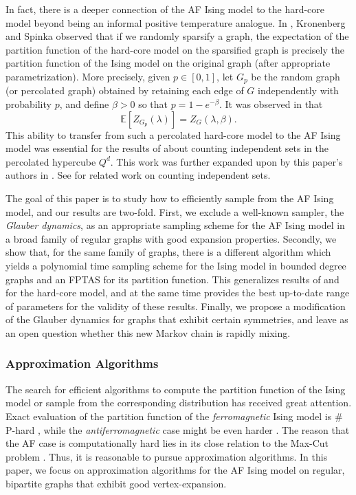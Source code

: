 \documentclass[reqno,a4paper,11pt]{amsart}
\newcommand{\lam}{\lambda}
\newcommand{\E}{\mathbb{E}}
\begin{document}
In fact, there is a deeper connection of the AF Ising model to the hard-core model beyond being an informal positive temperature analogue. In \cite{kronenberg2022independent}, Kronenberg and Spinka observed that if we randomly sparsify a graph, the expectation of the partition function of the hard-core model on the sparsified graph is precisely the partition function of the Ising model on the original graph (after appropriate parametrization). More precisely, given $p \in [0,1]$, let $G_p$ be the random graph (or percolated graph) obtained by retaining each edge of $G$ independently with probability $p$, and define $\beta > 0$ so that $p=1-e^{-\beta}$. It was observed in \cite{kronenberg2022independent} that
\begin{equation*}
    \E[Z_{G_p}(\lam)]=Z_G(\lam,\beta).
\end{equation*}
This ability to transfer from such a percolated hard-core model to the AF Ising model was essential for the results of \cite{kronenberg2022independent} about counting independent sets in the percolated hypercube $Q^d$. This work was further expanded upon by this paper's authors in \cite{GeKaSaWdo25}. See \cite{balogh2021independent,chowdhury2024gaussian, CEGK25,jenssen2020independent} for related work on counting independent sets.

The goal of this paper is to study how to efficiently sample from the AF Ising model, and our results are two-fold. First, we exclude a well-known sampler, the \textit{Glauber dynamics}, as an appropriate sampling scheme for the AF Ising model in a broad family of regular graphs with good expansion properties. Secondly, we show that, for the same family of graphs, there is a different algorithm which yields a polynomial time sampling scheme for the Ising model in bounded degree graphs and an FPTAS for its partition function. This generalizes results of \cite{GaTe2006} and \cite{JePePo23} for the hard-core model, and at the same time provides the best up-to-date range of parameters for the validity of these results. Finally, we propose a modification of the Glauber dynamics for graphs that exhibit certain symmetries, and leave as an open question whether this new Markov chain is rapidly mixing.


\subsubsection{Approximation Algorithms}
The search for efficient algorithms to compute the partition function of the Ising model or sample from the corresponding distribution has received great attention. Exact evaluation of the partition function of the \emph{ferromagnetic} Ising model is $\#$P-hard \cite{JeSi93}, while the \emph{antiferromagnetic} case might be even harder \cite{HuPePo24}. The reason that the AF case is computationally hard lies in its close relation to the Max-Cut problem \cite{CoLoMeSo22,DyHeJeMu21}. Thus, it is reasonable to pursue approximation algorithms. In this paper, we focus on approximation algorithms for the AF Ising model on regular, bipartite graphs that exhibit good vertex-expansion.
\end{document}
